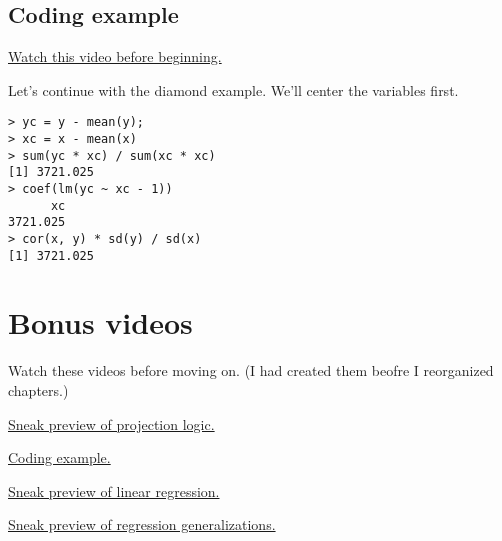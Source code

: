 \subsection{Coding example}

\href{https://www.youtube.com/watch?v=CrqNQEYF-nU&list=PLpl-gQkQivXhdgUCdaUQcdb31CRe8Mm2y&index=9}{Watch this video before beginning.}

Let's continue with the diamond example. We'll center the variables first.
\begin{verbatim}
> yc = y - mean(y);
> xc = x - mean(x)
> sum(yc * xc) / sum(xc * xc)
[1] 3721.025
> coef(lm(yc ~ xc - 1))
      xc 
3721.025 
> cor(x, y) * sd(y) / sd(x)
[1] 3721.025
\end{verbatim}

\section{Bonus videos}

\noindent
Watch these videos before moving on. (I had created them beofre I reorganized chapters.)

\href{https://www.youtube.com/watch?v=lmv88DtCNiU&list=PLpl-gQkQivXhdgUCdaUQcdb31CRe8Mm2y&index=10}{Sneak preview of projection logic.}

\href{https://www.youtube.com/watch?v=0Ld7sZ8FUs0&list=PLpl-gQkQivXhdgUCdaUQcdb31CRe8Mm2y&index=11}{Coding example.}

\href{https://www.youtube.com/watch?v=U5FAOdBDb90&list=PLpl-gQkQivXhdgUCdaUQcdb31CRe8Mm2y&index=12}{Sneak preview of linear regression.}

\href{https://www.youtube.com/watch?v=Ir1L-STFKfA&list=PLpl-gQkQivXhdgUCdaUQcdb31CRe8Mm2y&index=13}{Sneak preview of regression generalizations.}
